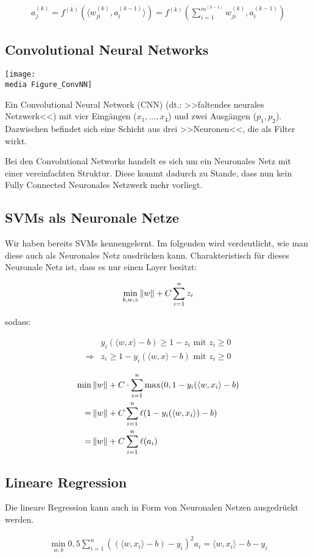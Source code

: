 \begin{align*}
a_j^{(k)} = f^{(k)} (\langle w_{ji}^{(k)}, a_i^{(k-1)}\rangle) = f^{(k)} (\sum_{i=1}^{m^{(k-1)}} w_{ji}^{(k)},a_i^{(k-1)} )
\end{align*}

\subsection{Convolutional Neural Networks}

\begin{dsafigure}
	\begin{center}
		\texttt{[image: \\media Figure\_ConvNN]}
		\caption{Ein Convolutional Neural Network (CNN) (dt.: >>faltendes neurales Netzwerk<<) mit vier Eingängen ($x_1, ..., x_4$) und zwei Ausgängen ($p_1, p_2$). Dazwischen befindet sich eine Schicht aus drei >>Neuronen<<, die als Filter wirkt.}
		\label{FigConvNN}
	\end{center}
\end{dsafigure}


Bei den Convolutional Networks handelt es sich um ein Neuronales Netz mit einer vereinfachten Struktur. Diese kommt dadurch zu Stande, dass nun kein Fully Connected Neuronales Netzwerk mehr vorliegt. 

\subsection{SVMs als Neuronale Netze}

Wir haben bereits SVMs kennengelernt. Im folgenden wird verdeutlicht, wie man diese auch als Neuronales Netz ausdrücken kann. Charakteristisch für dieses Neuronale Netz ist, dass es nur einen Layer besitzt:

\begin{align*}
\min\limits_{b,w,z} \left\lVert w\right\rVert + C  \sum_{i=1}^{n} z_i
\end{align*}

sodass:

\begin{align*}
&y_i (\langle w,x \rangle - b) \geq 1 - z_i \text { mit } z_i \geq 0 \\
\Rightarrow &z_i \geq 1- y_i (\langle w,x \rangle - b) \text{ mit } z_i \geq 0
\end{align*}


\begin{align*}
\min &\left\lVert w\right\rVert + C \cdot \sum_{i=1}^{n} \max (0, 1-y_i (\langle w,x_i\rangle-b) \\
 = &\left\lVert w\right\rVert + C \sum_{i=1}^{n} \ell ( 1-y_i (\langle w,x_i\rangle)-b) \\
=&\left\lVert w\right\rVert + C \sum_{i=1}^{n} \ell (a_i)
\end{align*}


\subsection{Lineare Regression}

Die lineare Regression kann auch in Form von Neuronalen Netzen ausgedrückt werden. 


\begin{align*}
\min\limits_{w,b} 0,5 \sum_{i=1}^{n} ((\langle w,x_i\rangle- b) -y_i)^2
a_i = \langle w,x_i\rangle -b-y_i
\end{align*}


